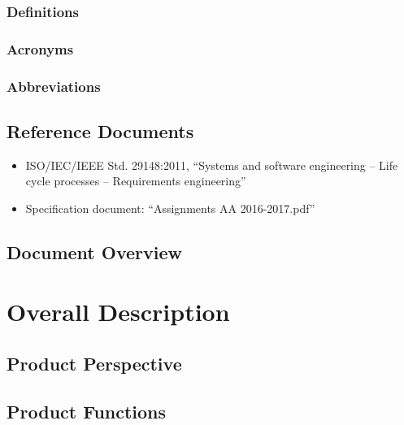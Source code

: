 \documentclass[english]{article}
\begin{document}
\subsubsection{Definitions}

\subsubsection{Acronyms}

\subsubsection{Abbreviations}

\subsection{Reference Documents}

\begin{itemize}
	\item{ISO/IEC/IEEE Std. 29148:2011, “Systems and software engineering -- Life cycle processes -- Requirements engineering”}
	\item{Specification document: “Assignments AA 2016-2017.pdf”}
\end{itemize}

\subsection{Document Overview}

\newpage{}

\section{Overall Description}

\subsection{Product Perspective}

\subsection{Product Functions}
\end{document}

